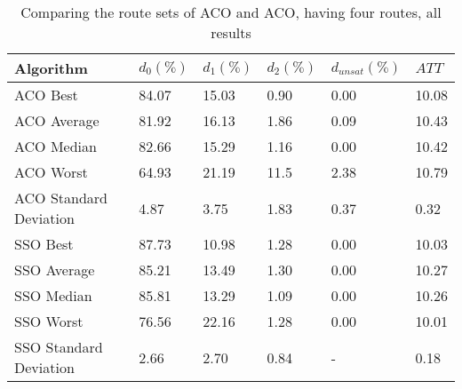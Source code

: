     \begin{table}[H]
    \centering
    \begin{tabular}{|l||l|l|l|l|l|}
    \hline
    Algorithm & $d_0(\%)$ & $d_1(\%)$ & $d_2(\%)$ & $d_{unsat}(\%)$ & $ATT$ \\
    \hline
    ACO Best & 84.07 & 15.03 & 0.90 & 0.00 & 10.08\\
    ACO Average & 81.92 & 16.13 & 1.86 & 0.09 & 10.43\\
    ACO Median & 82.66 & 15.29 & 1.16 & 0.00 & 10.42\\
    ACO Worst & 64.93 & 21.19 & 11.5 & 2.38 & 10.79\\
    ACO Standard Deviation & 4.87 & 3.75 & 1.83 & 0.37 & 0.32\\
    \hline
    \hline
    SSO Best & 87.73 & 10.98 & 1.28 & 0.00 & 10.03\\
    SSO Average & 85.21 & 13.49 & 1.30 & 0.00 & 10.27\\
    SSO Median & 85.81 & 13.29 & 1.09 & 0.00 & 10.26\\
    SSO Worst & 76.56 & 22.16 & 1.28 & 0.00 & 10.01\\
    SSO Standard Deviation & 2.66 & 2.70 & 0.84 & - & 0.18\\
    \hline
    \end{tabular}
    \caption {Comparing the route sets of ACO and ACO, having four routes, all results}
    \label{table:performanceComparison_ACOFull}
    \end{table}


